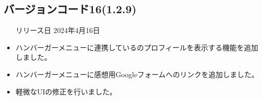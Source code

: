 \subsection*{バージョンコード16(1.2.9)}
\begin{itemize}
    \item[リリース日] 2024年4月16日
\end{itemize}

\new
\begin{itemize}
    \item ハンバーガーメニューに連携している\mi のプロフィールを表示する機能を追加しました。
    \item ハンバーガーメニューに感想用Googleフォームへのリンクを追加しました。
\end{itemize}

\change \par
\fix
\begin{itemize}
    \item 軽微なUIの修正を行いました。
\end{itemize}

